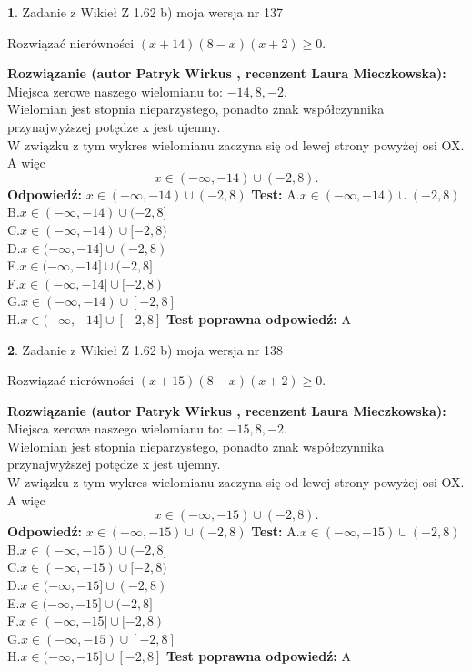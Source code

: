 \documentclass[12pt, a4paper]{article}
\theoremstyle{definition} %
\newtheorem{zad}{}
\newcommand{\zadStart}[1]{\begin{zad}#1\newline}
\newcommand{\zadStop}{\end{zad}}
\newcommand{\rozwStart}[2]{\noindent \textbf{Rozwiązanie (autor #1 , recenzent #2): }\newline}
\newcommand{\rozwStop}{\newline}
\newcommand{\odpStart}{\noindent \textbf{Odpowiedź:}\newline}
\newcommand{\odpStop}{\newline}
\newcommand{\testStart}{\noindent \textbf{Test:}\newline}
\newcommand{\testStop}{\newline}
\newcommand{\kluczStart}{\noindent \textbf{Test poprawna odpowiedź:}\newline}
\newcommand{\kluczStop}{\newline}
\begin{document}
\zadStart{Zadanie z Wikieł Z 1.62 b) moja wersja nr 137}

Rozwiązać nierówności $(x+14)(8-x)(x+2)\ge0$.
\zadStop
\rozwStart{Patryk Wirkus}{Laura Mieczkowska}
Miejsca zerowe naszego wielomianu to: $-14, 8, -2$.\\
Wielomian jest stopnia nieparzystego, ponadto znak współczynnika przy\linebreak najwyższej potędze x jest ujemny.\\ W związku z tym wykres wielomianu zaczyna się od lewej strony powyżej osi OX. A więc $$x \in (-\infty,-14) \cup (-2,8).$$
\rozwStop
\odpStart
$x \in (-\infty,-14) \cup (-2,8)$
\odpStop
\testStart
A.$x \in (-\infty,-14) \cup (-2,8)$\\
B.$x \in (-\infty,-14) \cup (-2,8]$\\
C.$x \in (-\infty,-14) \cup [-2,8)$\\
D.$x \in (-\infty,-14] \cup (-2,8)$\\
E.$x \in (-\infty,-14] \cup (-2,8]$\\
F.$x \in (-\infty,-14] \cup [-2,8)$\\
G.$x \in (-\infty,-14) \cup [-2,8]$\\
H.$x \in (-\infty,-14] \cup [-2,8]$
\testStop
\kluczStart
A
\kluczStop



\zadStart{Zadanie z Wikieł Z 1.62 b) moja wersja nr 138}

Rozwiązać nierówności $(x+15)(8-x)(x+2)\ge0$.
\zadStop
\rozwStart{Patryk Wirkus}{Laura Mieczkowska}
Miejsca zerowe naszego wielomianu to: $-15, 8, -2$.\\
Wielomian jest stopnia nieparzystego, ponadto znak współczynnika przy\linebreak najwyższej potędze x jest ujemny.\\ W związku z tym wykres wielomianu zaczyna się od lewej strony powyżej osi OX. A więc $$x \in (-\infty,-15) \cup (-2,8).$$
\rozwStop
\odpStart
$x \in (-\infty,-15) \cup (-2,8)$
\odpStop
\testStart
A.$x \in (-\infty,-15) \cup (-2,8)$\\
B.$x \in (-\infty,-15) \cup (-2,8]$\\
C.$x \in (-\infty,-15) \cup [-2,8)$\\
D.$x \in (-\infty,-15] \cup (-2,8)$\\
E.$x \in (-\infty,-15] \cup (-2,8]$\\
F.$x \in (-\infty,-15] \cup [-2,8)$\\
G.$x \in (-\infty,-15) \cup [-2,8]$\\
H.$x \in (-\infty,-15] \cup [-2,8]$
\testStop
\kluczStart
A
\kluczStop
\end{document}

